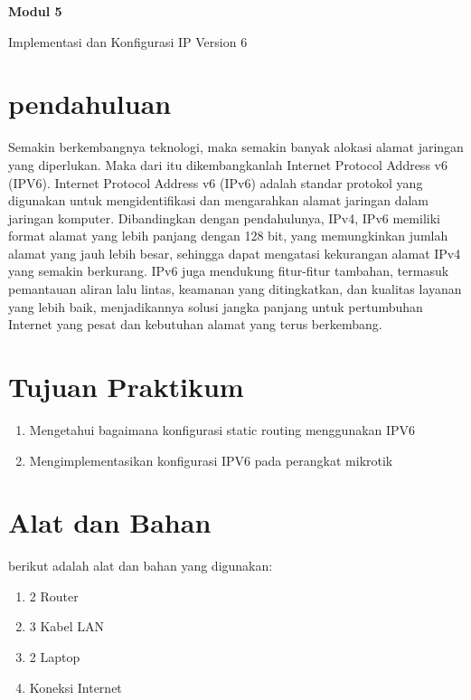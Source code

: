\newpage
\setcounter{section}{0}
\renewcommand{\thesection}{\arabic{section}}

\begin{center}
    \Huge
    \textbf{Modul 5}
    
    Implementasi dan Konfigurasi IP Version 6

\end{center}


\section{pendahuluan}

Semakin berkembangnya teknologi, maka semakin banyak alokasi alamat jaringan yang diperlukan. Maka dari itu dikembangkanlah Internet Protocol Address v6 (IPV6). Internet Protocol Address v6 (IPv6) adalah standar protokol yang digunakan untuk mengidentifikasi dan mengarahkan alamat jaringan dalam jaringan komputer. Dibandingkan dengan pendahulunya, IPv4, IPv6 memiliki format alamat yang lebih panjang dengan 128 bit, yang memungkinkan jumlah alamat yang jauh lebih besar, sehingga dapat mengatasi kekurangan alamat IPv4 yang semakin berkurang. IPv6 juga mendukung fitur-fitur tambahan, termasuk pemantauan aliran lalu lintas, keamanan yang ditingkatkan, dan kualitas layanan yang lebih baik, menjadikannya solusi jangka panjang untuk pertumbuhan Internet yang pesat dan kebutuhan alamat yang terus berkembang.

\section{Tujuan Praktikum}

\begin{enumerate}
    \item Mengetahui bagaimana konfigurasi static routing menggunakan IPV6
    \item Mengimplementasikan konfigurasi IPV6 pada perangkat mikrotik
\end{enumerate}

\section{Alat dan Bahan}

berikut adalah alat dan bahan yang digunakan:


\begin{enumerate}
    \item 2 Router
    \item 3 Kabel LAN
    \item 2 Laptop
    \item Koneksi Internet
\end{enumerate}

